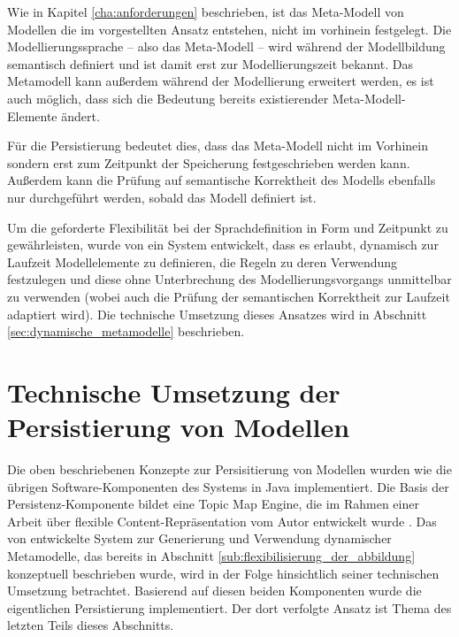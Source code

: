 Wie in Kapitel \ref{cha:anforderungen} beschrieben, ist das Meta-Modell von Modellen die im vorgestellten Ansatz entstehen, nicht im vorhinein festgelegt. Die Modellierungssprache -- also das Meta-Modell -- wird während der Modellbildung semantisch definiert und ist damit erst zur Modellierungszeit bekannt. Das Metamodell kann außerdem während der Modellierung erweitert werden, es ist auch möglich, dass sich die Bedeutung bereits existierender Meta-Modell-Elemente ändert.

Für die Persistierung bedeutet dies, dass das Meta-Modell nicht im Vorhinein sondern erst zum Zeitpunkt der Speicherung festgeschrieben werden kann. Außerdem kann die Prüfung auf semantische Korrektheit des Modells ebenfalls nur durchgeführt werden, sobald das Modell definiert ist. 

Um die geforderte Flexibilität bei der Sprachdefinition in Form und Zeitpunkt zu gewährleisten, wurde von \citet{Neubauer08} ein System entwickelt, dass es erlaubt, dynamisch zur Laufzeit Modellelemente zu definieren, die Regeln zu deren Verwendung festzulegen und diese ohne Unterbrechung des Modellierungsvorgangs unmittelbar zu verwenden (wobei auch die Prüfung der semantischen Korrektheit zur Laufzeit adaptiert wird). Die technische Umsetzung dieses Ansatzes wird in Abschnitt \ref{sec:dynamische_metamodelle} beschrieben.



\section{Technische Umsetzung der Persistierung von Modellen} %
\label{sec:technische_umsetzung_der_persistierung_von_modellen}

Die oben beschriebenen Konzepte zur Persisitierung von Modellen wurden wie die übrigen Software-Komponenten des Systems in Java implementiert. Die Basis der Persistenz-Komponente bildet eine Topic Map Engine, die im Rahmen einer Arbeit über flexible Content-Repräsentation vom Autor entwickelt wurde \citep{Oppl07}. Das von \citet{Neubauer08} entwickelte System zur Generierung und Verwendung dynamischer Metamodelle, das bereits in Abschnitt \ref{sub:flexibilisierung_der_abbildung} konzeptuell beschrieben wurde, wird in der Folge hinsichtlich seiner technischen Umsetzung betrachtet. Basierend auf diesen beiden Komponenten wurde die eigentlichen Persistierung implementiert. Der dort verfolgte Ansatz ist Thema des letzten Teils dieses Abschnitts.

